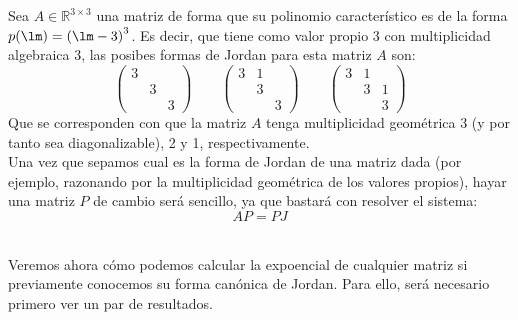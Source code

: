 \begin{ejemplo}
    Sea $A\in \mathbb{R}^{3\times 3}$ una matriz de forma que su polinomio característico es de la forma $p(\lm) = {(\lm-3)}^{3}$. Es decir, que tiene como valor propio 3 con multiplicidad algebraica 3, las posibes formas de Jordan para esta matriz $A$ son:
    \begin{equation*}
        \left(\begin{array}{ccc}
                3 & & \\
                  &3  & \\
                  &  &3 
        \end{array}\right) \qquad 
        \left(\begin{array}{ccc}
                3 & 1& \\
                  &3  & \\
                  &  &3 
        \end{array}\right)\qquad 
        \left(\begin{array}{ccc}
                3 & 1& \\
                  &3  & 1 \\
                  &  &3 
        \end{array}\right)
    \end{equation*}
    Que se corresponden con que la matriz $A$ tenga multiplicidad geométrica 3 (y por tanto sea diagonalizable), 2 y 1, respectivamente.\\

    Una vez que sepamos cual es la forma de Jordan de una matriz dada (por ejemplo, razonando por la multiplicidad geométrica de los valores propios), hayar una matriz $P$ de cambio será sencillo, ya que bastará con resolver el sistema:
    \begin{equation*}
        AP = PJ
    \end{equation*}
\end{ejemplo}~\\

Veremos ahora cómo podemos calcular la expoencial de cualquier matriz si previamente conocemos su forma canónica de Jordan. Para ello, será necesario primero ver un par de resultados.

